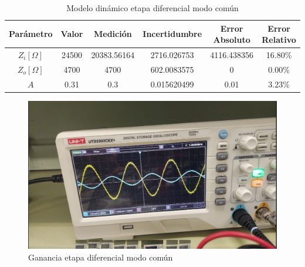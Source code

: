 \begin{table}[h!]
\centering
\begin{tabular}{|c|c|c|c|c|c|}
\hline
\textbf{Parámetro} & \textbf{Valor} & \textbf{Medición} & \textbf{Incertidumbre} & \textbf{Error Absoluto} & \textbf{Error Relativo} \\ \hline
$Z_i [\Omega]$ & 24500 & 20383.56164 & 2716.026753 & 4116.438356 & 16.80\% \\ \hline
$Z_o [\Omega]$ & 4700 & 4700 & 602.0083575 & 0 & 0.00\% \\ \hline
$A$ & 0.31 & 0.3 & 0.015620499 & 0.01 & 3.23\% \\ \hline
\end{tabular}
\caption{Modelo dinámico etapa diferencial modo común}
\label{tab:med-modelo-dinamico-etapa-diferencial-modo-comun}
\end{table}


\begin{figure}[ht]
    \centering
    \includegraphics[width=1.0\textwidth]{src/images/resultados/p2/med-ganancia-mod-comun.png}
    \caption{Ganancia etapa diferencial modo común}
    \label{fig:ganancia-etapa-diff-mod-comun}
\end{figure}


